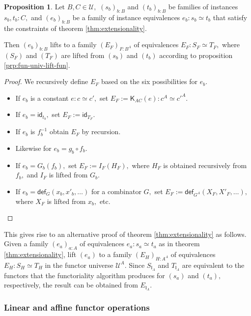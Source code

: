 \documentclass[a4paper]{article}
\theoremstyle{definition}
\newtheorem{proposition}[definition]{Proposition}
\theoremstyle{remark}
\renewcommand{\equiv}{\simeq}
\newcommand{\U}{\mathcal{U}}
\newcommand{\nm}{\mathsf}
\newcommand{\id}{\nm{id}}
\newcommand{\fndef}[1]{\nm{def}_{#1}}
\newcommand{\combinator}{\nm}
\newcommand{\idFun}{\combinator{I}}
\newcommand{\constFun}{\combinator{K}}
\begin{document}
\begin{proposition}
  \label{prp:fun-univ-lift-equiv}
  Let $B,C \in \U,$ $(s_b)_{b : B}$ and $(t_b)_{b : B}$ be families of instances
  $s_b,t_b : C,$ and $(e_b)_{b : B}$ be a family of instance equivalences
  $e_b : s_b \equiv t_b$ that satisfy the constraints of theorem
  \ref{thm:extensionality}.

  Then $(e_b)_{b : B}$ lifts to a family $(E_F)_{F : B^A}$ of equivalences
  $E_F : S_F \equiv T_F,$ where $(S_F)$ and $(T_F)$ are lifted from $(s_b)$
  and $(t_b)$ according to proposition \ref{prp:fun-univ-lift-fun}.
\end{proposition}

\begin{proof}
  We recursively define $E_F$ based on the six possibilities for $e_b.$
  \begin{itemize}
    \item If $e_b$ is a constant $e : c \equiv c',$ set
    $E_F := \constFun_{AC}(e) : c^A \equiv c'^A.$
    \item If $e_b = \id_{t_b},$ set $E_F := \id_{T_F}.$
    \item If $e_b$ is $f_b^{-1}$ obtain $E_F$ by recursion.
    \item Likewise for $e_b = g_b \circ f_b.$
    \item If $e_b = G_b(f_b),$ set $E_F := I_F(H_F),$ where $H_F$ is obtained recursively
    from $f_b,$ and $I_F$ is lifted from $G_b.$
    \item If $e_b = \fndef{G}(x_b,x'_b,\ldots)$ for a combinator $G,$ set
    $E_F := \fndef{G^A}(X_F,X'_F,\ldots),$ where $X_F$ is lifted from $x_b,$ etc.
    \qedhere
  \end{itemize}
\end{proof}

This gives rise to an alternative proof of theorem \ref{thm:extensionality} as follows.
Given a family $(e_a)_{a : A}$ of equivalences $e_a : s_a \equiv t_a$ as in theorem
\ref{thm:extensionality}, lift $(e_a)$ to a family $(E_H)_{H : A^A}$ of equivalences
$E_H : S_H \equiv T_H$ in the functor universe $\U^A.$ Since $S_{\idFun_A}$ and
$T_{\idFun_A}$ are equivalent to the functors that the functoriality algorithm
produces for $(s_a)$ and $(t_a),$ respectively, the result can be obtained from
$E_{\idFun_A}.$

\subsubsection*{Linear and affine functor operations}
\end{document}
